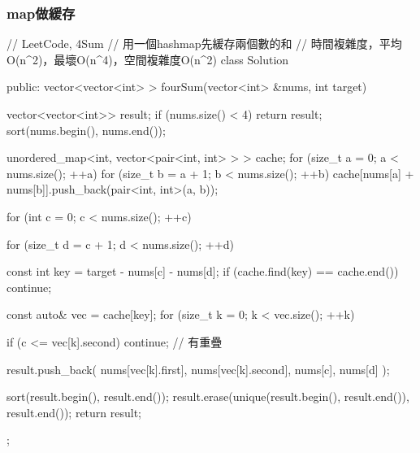 \subsubsection{map做緩存}
\begin{Code}
// LeetCode, 4Sum
// 用一個hashmap先緩存兩個數的和
// 時間複雜度，平均O(n^2)，最壞O(n^4)，空間複雜度O(n^2)
class Solution {
public:
    vector<vector<int> > fourSum(vector<int> &nums, int target) {
        vector<vector<int>> result;
        if (nums.size() < 4) return result;
        sort(nums.begin(), nums.end());

        unordered_map<int, vector<pair<int, int> > > cache;
        for (size_t a = 0; a < nums.size(); ++a) {
            for (size_t b = a + 1; b < nums.size(); ++b) {
                cache[nums[a] + nums[b]].push_back(pair<int, int>(a, b));
            }
        }

        for (int c = 0; c < nums.size(); ++c) {
            for (size_t d = c + 1; d < nums.size(); ++d) {
                const int key = target - nums[c] - nums[d];
                if (cache.find(key) == cache.end()) continue;

                const auto& vec = cache[key];
                for (size_t k = 0; k < vec.size(); ++k) {
                    if (c <= vec[k].second)
                        continue; // 有重疊

                    result.push_back( { nums[vec[k].first],
                            nums[vec[k].second], nums[c], nums[d] });
                }
            }
        }
        sort(result.begin(), result.end());
        result.erase(unique(result.begin(), result.end()), result.end());
        return result;
    }
};
\end{Code}



